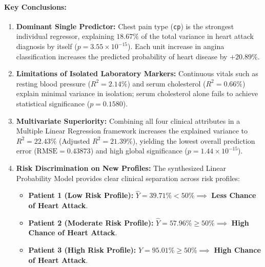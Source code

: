 \documentclass[12pt,a4paper]{article}
\begin{document}
\paragraph{Key Conclusions:}
\begin{enumerate}
    \item \textbf{Dominant Single Predictor:} Chest pain type (\texttt{cp}) is the strongest individual regressor, explaining $18.67\%$ of the total variance in heart attack diagnosis by itself ($p = 3.55 \times 10^{-15}$). Each unit increase in angina classification increases the predicted probability of heart disease by $+20.89\%$.
    \item \textbf{Limitations of Isolated Laboratory Markers:} Continuous vitals such as resting blood pressure ($R^2 = 2.14\%$) and serum cholesterol ($R^2 = 0.66\%$) explain minimal variance in isolation; serum cholesterol alone fails to achieve statistical significance ($p = 0.1580$).
    \item \textbf{Multivariate Superiority:} Combining all four clinical attributes in a Multiple Linear Regression framework increases the explained variance to $R^2 = 22.43\%$ (Adjusted $R^2 = 21.39\%$), yielding the lowest overall prediction error ($\text{RMSE} = 0.43873$) and high global significance ($p = 1.44 \times 10^{-15}$).
    \item \textbf{Risk Discrimination on New Profiles:} The synthesized Linear Probability Model provides clear clinical separation across risk profiles:
    \begin{itemize}
        \item \textbf{Patient 1 (Low Risk Profile):} $\hat{Y} = 39.71\% < 50\% \implies$ \textbf{Less Chance of Heart Attack}.
        \item \textbf{Patient 2 (Moderate Risk Profile):} $\hat{Y} = 57.96\% \ge 50\% \implies$ \textbf{High Chance of Heart Attack}.
        \item \textbf{Patient 3 (High Risk Profile):} $\hat{Y} = 95.01\% \ge 50\% \implies$ \textbf{High Chance of Heart Attack}.
    \end{itemize}
\end{enumerate}
\end{document}
